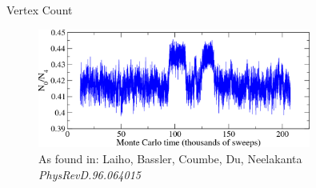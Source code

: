 \begin{frame}{Vertex Count}
 \begin{figure}
  \centering
  \includegraphics[width=0.8\textwidth]{pics/VertexCount}
  \caption{\tiny{As found in: Laiho, Bassler, Coumbe, Du, Neelakanta \emph{PhysRevD.96.064015}}}
 \end{figure}
\end{frame}


